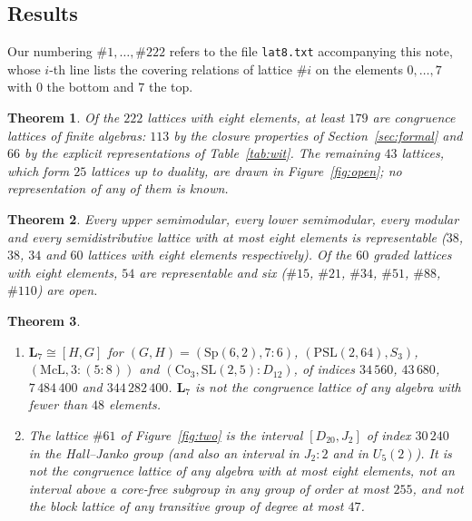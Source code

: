 \documentclass[11pt]{article}
\newtheorem{theorem}{Theorem}
\theoremstyle{remark}
\newcommand{\LL}{\mathbf{L}_7}
\newcommand{\lat}[1]{\##1}
\begin{document}
\subsection*{Results}
Our numbering $\lat1,\dots,\lat{222}$ refers to the file \texttt{lat8.txt} accompanying this note,
whose $i$-th line lists the covering relations of lattice $\lat i$ on the elements $0,\dots,7$ with
$0$ the bottom and $7$ the top.

\begin{theorem}\label{thm:census}
Of the $222$ lattices with eight elements, at least $179$ are congruence lattices of finite
algebras: $113$ by the closure properties of Section~\ref{sec:formal} and $66$ by the explicit
representations of Table~\ref{tab:wit}. The remaining $43$ lattices, which form $25$ lattices up to
duality, are drawn in Figure~\ref{fig:open}; no representation of any of them is known.
\end{theorem}

\begin{theorem}\label{thm:classes}
Every upper semimodular, every lower semimodular, every modular and every semidistributive lattice
with at most eight elements is representable ($38$, $38$, $34$ and $60$ lattices with eight
elements respectively). Of the $60$ graded lattices with eight elements, $54$ are representable
and six ($\lat{15}$, $\lat{21}$, $\lat{34}$, $\lat{51}$, $\lat{88}$, $\lat{110}$) are open.
\end{theorem}

\begin{theorem}\label{thm:two}
\begin{enumerate}
\item $\LL\cong[H,G]$ for $(G,H)=(\mathrm{Sp}(6,2),7{:}6)$, $(\mathrm{PSL}(2,64),S_3)$,
$(\mathrm{McL},3{:}(5{:}8))$ and $(\mathrm{Co}_3,\mathrm{SL}(2,5){:}D_{12})$, of indices
$34\,560$, $43\,680$, $7\,484\,400$ and $344\,282\,400$. $\LL$ is not the congruence lattice of
any algebra with fewer than $48$ elements.
\item The lattice $\lat{61}$ of Figure~\ref{fig:two} is the interval $[D_{20},J_2]$ of index
$30\,240$ in the Hall--Janko group (and also an interval in $J_2{:}2$ and in $U_5(2)$). It is not
the congruence lattice of any algebra with at most eight elements, not an interval above a
core-free subgroup in any group of order at most $255$, and not the block lattice of any transitive
group of degree at most $47$.
\end{enumerate}
\end{theorem}
\end{document}
